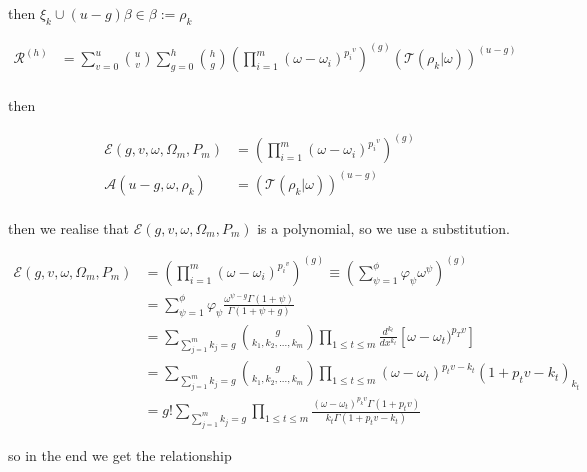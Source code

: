then \(\xi_k \cup (u-g)\beta \in \beta := \rho_k\)

\begin{align}
        \mathcal{R}^{(h)}  &= \sum_{v=0}^u \binom{u}{v} \sum_{g=0}^h \binom{h}{g}
        \left(\prod_{i=1}^m (\omega - \omega_i)^{p_i}^{v} \right)^{(g)} 
        \left(\mathcal{T}(\rho_k | \omega) \right)^{(u-g)} \\
\end{align}

then

\begin{align}
        \mathcal{E}(g, v, \omega, \Omega_m, P_m) &= \left(\prod_{i=1}^m(\omega
        - \omega_i)^{p_i}^{v} \right)^{(g)} \\
        \mathcal{A}(u-g, \omega, \rho_k) &= \left(\mathcal{T}(\rho_k | \omega) 
        \right)^{(u-g)} \\
\end{align}

then we realise that \(\mathcal{E}(g, v, \omega, \Omega_m, P_m)\) 
is a polynomial, so we use a substitution.

\begin{align}
        \mathcal{E}(g, v, \omega, \Omega_m, P_m) &= \left(\prod_{i=1}^m(\omega 
        - \omega_i)^{p_i}^{v} \right)^{(g)} \equiv  \left(\sum_{\psi=1}^\phi 
        \varphi_\psi \omega^\psi \right)^{(g)} \\ & = \sum_{\psi = 1}^\phi 
        \varphi_\psi \frac{\omega^{\psi - g}\Gamma(1+\psi)}{\Gamma(1 + \psi + g)} \\
        &= \sum_{\sum_{j=1}^m k_j = g} \binom{g}{k_1, k_2, ..., k_m} \prod_{1 
        \leq t \leq m} \frac{d^{k_t}}{dx^{k_t}} \left[ \omega - \omega_t )^{p_T 
        v}\right] \\
        &=  \sum_{\sum_{j=1}^m k_j = g} \binom{g}{k_1, k_2, ..., k_m} \prod_{1
        \leq t \leq m} (\omega - \omega_t)^{p_t v - k_t} (1+p_t v - k_t)_{k_t} \\
        &= g! \sum_{\sum_{j=1}^m k_j = g}\prod_{1 \leq t \leq m} \frac{(\omega 
        - \omega_t)^{p_k v}\Gamma(1+p_t v)}{k_t\Gamma(1+p_t v - k_t)}
\end{align}

so in the end we get the relationship

